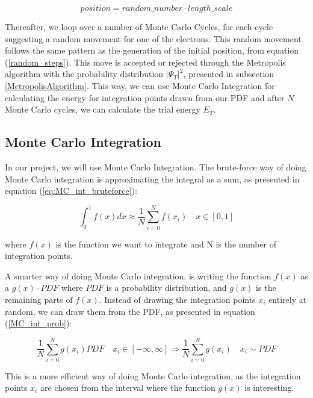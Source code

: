 \documentclass[norsk,a4paper,12pt]{article}
\begin{document}
\begin{equation}
    position =  random\_number \cdot length\_scale
    \label{random_steps}
\end{equation}

Thereafter, we loop over a number of Monte Carlo Cycles, for each cycle suggesting a random movement for one of the electrons. This random movement follows the same pattern as the generation of the initial position, from equation (\ref{random_steps}). This move is accepted or rejected through the Metropolis algorithm with the probability distribution $|\Psi_T|^2$, presented in subsection \ref{MetropolisAlgorithm}. This way, we can use Monte Carlo Integration for calculating the energy for integration points drawn from our PDF and after $N$ Monte Carlo cycles, we can calculate the trial energy $E_T$.

\subsection{Monte Carlo Integration}
In our project, we will use Monte Carlo Integration. The brute-force way of doing Monte Carlo integration is approximating the integral as a sum, as presented in equation (\ref{eq:MC_int_bruteforce}):

\begin{equation}
    \int_0^1 f(x) dx \approx  \frac{1}{N}\sum_{i=0}^N f(x_i) \quad x \in [0,1]
    \label{eq:MC_int_bruteforce}
\end{equation}

where $f(x)$ is the function we want to integrate and N is the number of integration points. 

A smarter way of doing Monte Carlo integration, is writing the function $f(x)$ as a $g(x)\cdot PDF$ where $PDF$ is a probability distribution, and $g(x)$ is the remaining parts of $f(x)$. Instead of drawing the integration points $x_i$ entirely at random, we can draw them from the PDF, as presented in equation (\ref{MC_int_prob}):

\begin{equation}
    \frac{1}{N}\sum_{i=0}^N g(x_i) PDF \quad x_i \in [-\infty, \infty] \Rightarrow \frac{1}{N} \sum_{i=0}^N g(x_i) \quad x_i \sim PDF
    \label{MC_int_prob}
\end{equation}

This is a more efficient way of doing Monte Carlo integration, as the integration points $x_i$ are chosen from the interval where the function $g(x)$ is interesting.\par 
\end{document}

